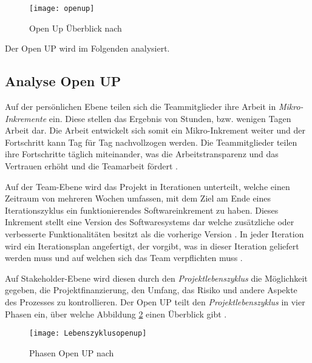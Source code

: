\begin{figure}[htp]
\begin{center}
  \texttt{[image: openup]} %
  \caption{Open Up Überblick nach \cite{eclipseopenup}}
  \label{fig:openup}
\end{center}
\end{figure}

Der Open UP wird im Folgenden analysiert.

\subsection{Analyse Open UP}


Auf der persönlichen Ebene teilen sich die Teammitglieder ihre Arbeit in \textit{Mikro-Inkremente} ein. Diese stellen das Ergebnis von Stunden, bzw. wenigen Tagen Arbeit dar. Die Arbeit entwickelt sich somit ein Mikro-Inkrement weiter und der Fortschritt kann Tag für Tag nachvollzogen werden. Die Teammitglieder teilen ihre Fortschritte täglich miteinander, was die Arbeitstransparenz und das Vertrauen erhöht und die Teamarbeit fördert \cite{eclipseopenup}. \newline

Auf der Team-Ebene wird das Projekt in Iterationen unterteilt, welche einen Zeitraum von mehreren Wochen umfassen, mit dem Ziel am Ende eines Iterationszyklus ein funktionierendes Softwareinkrement zu haben. Dieses Inkrement stellt eine Version des Softwaresystems dar welche zusätzliche oder verbesserte Funktionalitäten besitzt als die vorherige Version \cite{Basem2010}.  In jeder Iteration wird ein Iterationsplan angefertigt,  der vorgibt, was in dieser Iteration geliefert werden muss und auf welchen sich das Team verpflichten muss \cite{freudenreichevaluierung}.

Auf Stakeholder-Ebene wird diesen durch den \textit{Projektlebenszyklus} die Möglichkeit gegeben, die Projektfinanzierung, den Umfang, das Risiko und andere Aspekte des Prozesses zu kontrollieren.
Der Open UP teilt den \textit{Projektlebenszyklus} in vier Phasen ein, über welche Abbildung \ref{fig:Phasen} einen Überblick gibt \cite{eclipseopenup}.

\begin{figure}[htp]
\begin{center}
  \texttt{[image: Lebenszyklusopenup]} %
  \caption{Phasen Open UP nach \cite{eclipseopenup}}
  \label{fig:Phasen}
\end{center}
\end{figure}


